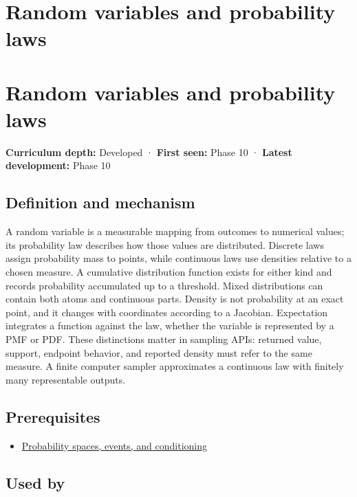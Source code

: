 \hypertarget{appendix-4d0203f7944f}{}
\section*{Random variables and probability laws}
\section{Random variables and probability laws}\label{random-variables-and-probability-laws}

\textbf{Curriculum depth:} Developed · \textbf{First seen:} Phase 10 · \textbf{Latest development:} Phase 10

\subsection{Definition and mechanism}\label{definition-and-mechanism}

A random variable is a measurable mapping from outcomes to numerical values; its probability law describes how those values are distributed. Discrete laws assign probability mass to points, while continuous laws use densities relative to a chosen measure. A cumulative distribution function exists for either kind and records probability accumulated up to a threshold. Mixed distributions can contain both atoms and continuous parts. Density is not probability at an exact point, and it changes with coordinates according to a Jacobian. Expectation integrates a function against the law, whether the variable is represented by a PMF or PDF. These distinctions matter in sampling APIs: returned value, support, endpoint behavior, and reported density must refer to the same measure. A finite computer sampler approximates a continuous law with finitely many representable outputs.

\subsection{Prerequisites}\label{prerequisites}

\begin{itemize}
\tightlist
\item
  \hyperref[appendix-f1ef323f6ed7]{Probability spaces, events, and conditioning}
\end{itemize}

\subsection{Used by}\label{used-by}

